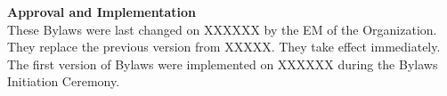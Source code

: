 \documentclass[10pt]{article}
\newcounter{qcounter}
\begin{document}
\begin{list}{{\bf Article :~}}{}
\item {\bf Approval and Implementation}\\
These Bylaws were last changed on XXXXXX by the EM of the Organization. They replace the previous version from XXXXX. They take effect immediately. The first version of Bylaws were implemented on XXXXXX during the Bylaws Initiation Ceremony.

\end{list}


  
\end{document}
